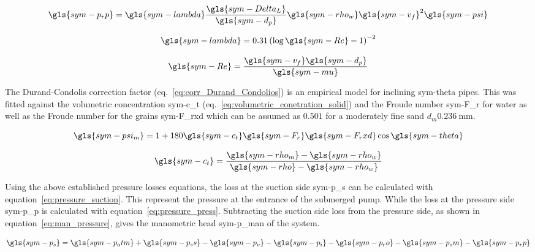 \begin{equation}
    \label{eq:loss_due_length}
    \gls{sym-p_rp} = \gls{sym-lambda} \frac{\gls{sym-Delta_L}}{\gls{sym-d_p}} \gls{sym-rho_w} \gls{sym-v_f}^2 
	\gls{sym-psi}
\end{equation}

\begin{equation}
    \label{eq:jufin_friction_factor}
    \gls{sym-lambda} =  0.31 \left(\log \gls{sym-Re} - 1\right)^{-2}
\end{equation}

\begin{equation}
    \label{eq:reynoldsnumber}
    \gls{sym-Re} = \frac{\gls{sym-v_f} \gls{sym-d_p}}{\gls{sym-mu}}
\end{equation}

\noindent The Durand-Condolis correction factor (eq.~\ref{eq:corr_Durand_Condolios}) is an empirical model for inclining
\gls{sym-theta} pipes. This was fitted against the volumetric concentration \gls{sym-c_t}
(eq.~\ref{eq:volumetric_conetration_solid}) and the Froude number \gls{sym-F_r} for water as well as the Froude number
for the grains \gls{sym-F_rxd}  which can be assumed as \( 0.501 \) for a moderately fine sand \(d_m
\SI{0.236}{\milli\meter} \).

\begin{equation}
    \label{eq:corr_Durand_Condolios}
    \gls{sym-psi_m} = 1 + 180 \gls{sym-c_t} \gls{sym-F_r} \gls{sym-F_rxd} \cos \gls{sym-theta}
\end{equation}

\begin{equation}
    \label{eq:volumetric_conetration_solid}
    \gls{sym-c_t} = \frac{\gls{sym-rho_m} - \gls{sym-rho_w}}{\gls{sym-rho} - \gls{sym-rho_w}}
\end{equation}

Using the above established pressure losses equations, the loss at the suction side \gls{sym-p_s} can be calculated with
equation~\ref{eq:pressure_suction}. This represent the pressure at the entrance of the submerged pump. While the loss at
the pressure side \gls{sym-p_p} is calculated with equation~\ref{eq:pressure_press}. Subtracting the suction side loss
from the pressure side, as shown in equation~\ref{eq:man_pressure}, gives the manometric head \gls{sym-p_man} of the
system.

\begin{equation}
    \label{eq:pressure_suction}
    \gls{sym-p_s} = \gls{sym-p_atm} + \gls{sym-p_ss} - \gls{sym-p_v} - \gls{sym-p_i} - \gls{sym-p_ro} - 
	\gls{sym-p_sm} - \gls{sym-p_rp}
\end{equation}


